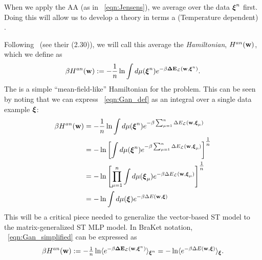 {When we apply the AA (as in \EQN~\ref{eqn:Jensens}), 
we average over the data $\boldsymbol{\xi}^{n}$ first. 
Doing this will allow us to develop a theory in terms a (Temperature dependent) \EffectivePotential. 

Following~\cite{SST92} (see their \EQN(2.30)), we will call this average the \emph{\Annealed Hamiltonian}, $H^{an}({\mathbf{w}})$, 
which we define as  %
  \begin{align}
   \label{eqn:Gan_def}
   \beta H^{an}({\mathbf{w}}):= - \frac{1}{n}\ln  \int d\mu(\boldsymbol{\xi}^{n})e^{-\beta\mathbf{\Delta {E}}_{\mathcal{L}}(\mathbf{w}, \boldsymbol{\xi}^{n})}.
  \end{align}
The \AnnealedHamiltonian is a simple ``mean-field-like'' Hamiltonian for the problem.
This can be seen by noting that we can express \EQN~\ref{eqn:Gan_def} as an integral over a single data example $\boldsymbol{\xi}$:
 \begin{align}
   \nonumber
   \beta H^{an}({\mathbf{w}}) &=  - \frac{1}{n}\ln  \int d\mu(\boldsymbol{\xi}^{n})e^{-\beta\sum_{\mu=1}^{n}\Delta E_{\mathcal{L}}({\mathbf{w}},\boldsymbol{\xi}_{\mu})} \\ \nonumber
   &=  - \ln \left[\int d\mu(\boldsymbol{\xi}^{n})e^{-\beta\sum_{\mu=1}^{n}\Delta E_{\mathcal{L}}({\mathbf{w}},\boldsymbol{\xi}_{\mu})}\right]^{\tfrac{1}{n}} \\ \nonumber
   &=  - \ln \left[\prod_{\mu=1}^{n}\int d\mu(\boldsymbol{\xi}_{\mu})e^{-\beta\Delta E_{\mathcal{L}}({\mathbf{w}},\boldsymbol{\xi}_{\mu})}\right]^{\tfrac{1}{n}} \\ 
   \label{eqn:Gan_simplified}
   &=  - \ln  \int d\mu(\boldsymbol{\xi})e^{-\beta\Delta E({\mathbf{w}},\boldsymbol{\xi})}
 \end{align}
This will be a critical piece needed to generalize the vector-based ST \Perceptron model to the matrix-generalized ST MLP model.
In BraKet notation, \EQN~\ref{eqn:Gan_simplified} can be expressed as
\begin{eqnarray*}
    \beta H^{an}({\mathbf{w}}):=  -\tfrac{1}{n}\ln\langle e^{-\beta\mathbf{\Delta {E}}_{\mathcal{L}}(\mathbf{w}, \boldsymbol{\xi}^{n})}\rangle_{\boldsymbol{\xi}^{n}}=  -\ln \langle e^{-\beta\Delta E({\mathbf{w}},\boldsymbol{\xi})}\rangle_{\boldsymbol{\xi}}.
\end{eqnarray*}

}
